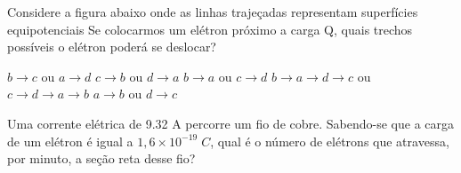 \documentclass[12pt, addpoints]{exam}
\begin{document}
    \begin{questions}
\begin{multicols*}{2}
\question Considere a figura abaixo onde as linhas trajeçadas representam superfícies equipotenciais Se colocarmos um elétron próximo a carga Q, quais trechos possíveis o elétron poderá se deslocar?
        
        \begin{center}
            \begin{minipage}[c]{0.5\linewidth}
            \end{minipage}
        \end{center}
        
        

\begin{choices}
\choice $b\rightarrow c$ ou $a\rightarrow d$ 
\choice $c\rightarrow b$ ou $d\rightarrow a$ 
\choice $b\rightarrow a$ ou $c\rightarrow d$ 
\choice $b\rightarrow a\rightarrow d\rightarrow c$ ou $c\rightarrow d\rightarrow a\rightarrow b$ 
\choice $a\rightarrow b$ ou $d\rightarrow c$ 
\end{choices}
\question Uma corrente elétrica de    9.32 A percorre um ﬁo de cobre. Sabendo-se que a carga de um elétron é igual a $1,6\times 10^{-19}\;C$, qual é o número de elétrons que atravessa, por minuto, a seção reta desse ﬁo?


\end{multicols*}
\end{questions}
\end{document}
